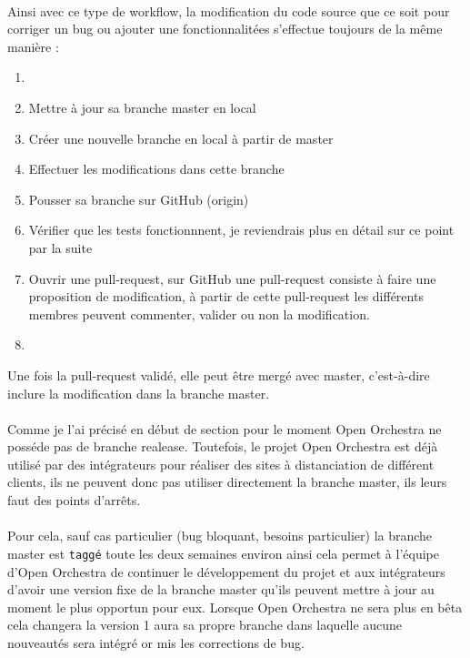 \paragraph{}
Ainsi avec ce type de workflow, la modification du code source que ce soit pour corriger un bug ou ajouter une fonctionnalitées s'effectue toujours de la même manière : 
\begin{enumerate}
\item[]
\item Mettre à jour sa branche master en local
\item Créer une nouvelle branche en local à partir de master
\item Effectuer les modifications dans cette branche
\item Pousser sa branche sur GitHub (origin)
\item Vérifier que les tests fonctionnnent, je reviendrais plus en détail sur ce point par la suite
\item Ouvrir une pull-request, sur GitHub une pull-request consiste à faire une proposition de modification, à partir de cette pull-request les différents membres peuvent commenter, valider ou non la modification.
         \item[]
\end{enumerate}

Une fois la pull-request validé, elle peut être mergé avec master, c'est-à-dire inclure la modification dans la branche master.
\paragraph{}
Comme je l'ai précisé en début de section pour le moment Open Orchestra ne posséde pas de branche realease. Toutefois, le projet Open Orchestra est déjà utilisé par des intégrateurs pour réaliser des sites à distanciation de différent clients, ils ne peuvent donc pas utiliser directement la branche master, ils leurs faut des points d'arrêts. 

\paragraph{}
Pour cela, sauf cas particulier (bug bloquant, besoins particulier) la branche master est \verb?taggé? toute les deux semaines environ ainsi cela permet à l'équipe d'Open Orchestra de continuer le développement  du projet et aux intégrateurs d'avoir une version fixe de la branche master qu'ils peuvent mettre à jour au moment le plus opportun pour eux.  Lorsque Open Orchestra ne sera plus en bêta cela changera la version 1 aura sa propre branche dans laquelle aucune nouveautés sera intégré or mis les corrections de bug.


